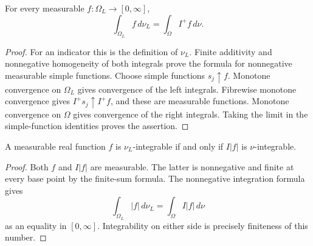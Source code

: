 \begin{theorem}\label{thm:separable-lintegral}
\leanok
{}
For every measurable $f:\Omega_L\to[0,\infty]$,
\[
 \int_{\Omega_L}f\,d\nu_L=\int_\Omega I^+f\,d\nu.
\]
\end{theorem}
\begin{proof}
For an indicator this is the definition of $\nu_L$. Finite additivity
and nonnegative homogeneity of both integrals prove the formula for
nonnegative measurable simple functions. Choose simple functions
$s_j\uparrow f$. Monotone convergence on $\Omega_L$ gives convergence
of the left integrals. Fibrewise monotone convergence gives
$I^+s_j\uparrow I^+f$, and these are measurable functions. Monotone
convergence on $\Omega$ gives convergence of the right integrals.
Taking the limit in the simple-function identities proves the assertion.
\end{proof}

\begin{theorem}\label{thm:separable-integrability}
\leanok
{}
A measurable real function $f$ is $\nu_L$-integrable if and only if
$I|f|$ is $\nu$-integrable.
\end{theorem}
\begin{proof}
Both $f$ and $I|f|$ are measurable. The latter is nonnegative and finite
at every base point by the finite-sum formula. The nonnegative integration
formula gives
\[
 \int_{\Omega_L}|f|\,d\nu_L=\int_\Omega I|f|\,d\nu
\]
as an equality in $[0,\infty]$. Integrability on either side is precisely
finiteness of this number.
\end{proof}

